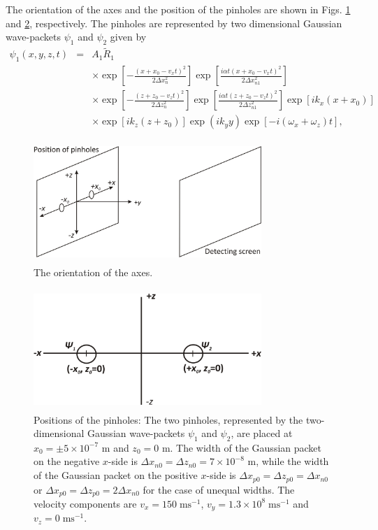 \documentclass[12pt]{article}       %
\begin{document}
The orientation of the axes and the position of the pinholes are shown in Figs. \ref{OrAxes} and \ref{figPos}, respectively.
The pinholes are represented by two dimensional Gaussian wave-packets  $\psi_1$ and $\psi_2$ given by
\begin{eqnarray}
\psi_1(x,y,z,t)&=&A_1\tilde{R}_{1}\nonumber\\
&&\times\exp\left[{-  \frac{(x+x_0-v_x t)^2}{2\Delta x_n^2}}\right]\exp\left[{\frac{i\alpha t(x+x_0-v_x t)^2}{2\Delta x_{n1}^2}}\right]\nonumber\\
&&\times\exp\left[{-  \frac{(z+z_0-v_z t)^2}{2\Delta z_n^2}}\right] \exp\left[{\frac{i\alpha t(z+z_0-v_z t)^2}{2\Delta z_{n1}^2}}\right]\exp\left[ik_x(x+x_0)\right]\nonumber\\
&&\times\exp\left[ik_z(z+z_0)\right]\exp\left(ik_y y\right)\exp\left[-i(\omega_x+\omega_z) t\right],\label{psi1}
\end{eqnarray}
\begin{figure}[h]
\unitlength=1in
\hspace*{1.3in}\includegraphics[width=3.4in,height=1.8in]{figure1.jpg}  
\caption{The orientation of the axes.\label{OrAxes}}
\end{figure}
\begin{figure}[h]
\unitlength=1in
\hspace*{1.3in}\includegraphics[width=3.4in,height=1.8in]  {figure2.jpg}  
\caption{Positions of the pinholes: The two pinholes, represented by the two-dimensional Gaussian wave-packets $\psi_1$ and $\psi_2$, are placed at $x_0=\pm5\times10^{-7}$ m and  $z_0=0$ m. The width of  the Gaussian packet on the negative $x$-side is $\Delta x_{n0}=\Delta z_{n0}=7\times 10^{-8}$ m, while the width  of the Gaussian packet on the positive $x$-side is $\Delta x_{p0}=\Delta z_{p0}=\Delta x_{n0}$  or $\Delta x_{p0}=\Delta z_{p0}=2\Delta x_{n0}$ for the case of unequal widths.  The velocity components are  $v_x=150\;\mathrm{ms}^{-1}$, $v_y=1.3\times 10^{8}\;\mathrm{ms}^{-1}$ and  $v_z=0\;\mathrm{ms}^{-1}$.\label{figPos} }
\end{figure}
\end{document}
